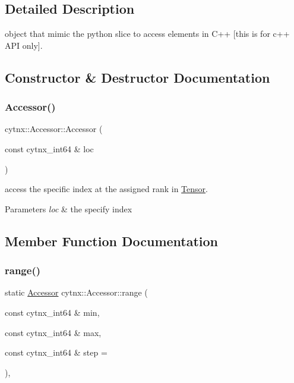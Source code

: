 \subsection{Detailed Description}
object that mimic the python slice to access elements in C++ \mbox{[}this is for c++ A\+PI only\mbox{]}. 

\subsection{Constructor \& Destructor Documentation}
\mbox{\label{classcytnx_1_1Accessor_a9f6fa9087f09756e020355a05196d384}} 
\subsubsection{\texorpdfstring{Accessor()}{Accessor()}}
{\footnotesize\ttfamily cytnx\+::\+Accessor\+::\+Accessor (\begin{DoxyParamCaption}\item[{const cytnx\+\_\+int64 \&}]{loc }\end{DoxyParamCaption})}



access the specific index at the assigned rank in \hyperlink{classcytnx_1_1Tensor}{Tensor}. 


\begin{DoxyParams}{Parameters}
{\em loc} & the specify index \\
\hline
\end{DoxyParams}


\subsection{Member Function Documentation}
\mbox{\label{classcytnx_1_1Accessor_a7a5a508a58b71897c3dd162195aceaa9}} 
\subsubsection{\texorpdfstring{range()}{range()}}
{\footnotesize\ttfamily static \hyperlink{classcytnx_1_1Accessor}{Accessor} cytnx\+::\+Accessor\+::range (\begin{DoxyParamCaption}\item[{const cytnx\+\_\+int64 \&}]{min,  }\item[{const cytnx\+\_\+int64 \&}]{max,  }\item[{const cytnx\+\_\+int64 \&}]{step = {} }\end{DoxyParamCaption})\hspace{0.3cm}{\ttfamily [inline]}, {\ttfamily [static]}}



